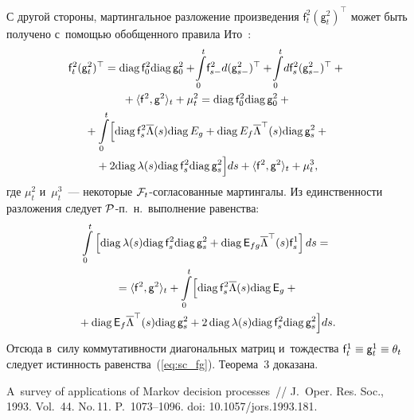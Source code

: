\begin{multicols}{2}
{   С другой стороны, мартингальное разложение произведения $\mathsf{f}_t^2 
(\mathsf{g}_t^2)^{\top} $ может быть получено с~по\-мощью обобщенного правила Ито~\cite{LSh_86}:
    \begin{multline*}
   \mathsf{f}_t^2 (\mathsf{g}_t^2)^{\top} =
   \mathrm{diag}\, \mathsf{f}_0^2  \mathrm{diag}\, \mathsf{g}_0^2 + \!\int\limits_0^t\! \mathsf{f}_{s-}^2d(\mathsf{g}_{s-}^2)^{\top} 
   +\!\int\limits_0^t \! d \mathsf{f}_{s}^2(\mathsf{g}_{s-}^2)^{\top} +{}\\
   {}+ \langle 
\mathsf{f}^2, \mathsf{g}^2\rangle_t + \mu_t^2 =
        \mathrm{diag}\, \mathsf{f}_0^2  \mathrm{diag}\, \mathsf{g}_0^2 + {}\\
        {} + \int\limits_0^t
    \Bigl[ \mathrm{diag}\, \mathsf{f}_{s}^2 \overline{\Lambda}(s) \mathrm{diag}\, E_g +
    \mathrm{diag}\, E_f \overline{\Lambda}^{\top}(s) \mathrm{diag}\, \mathsf{g}_{s}^2 +{}\\
    {}+
    2 \mathrm{diag}\, \lambda(s) \mathrm{diag}\, \mathsf{f}^2_s \mathrm{diag}\, \mathsf{g}^2_s
    \Bigl]ds +   \langle \mathsf{f}^2, \mathsf{g}^2\rangle_t + \mu_t^3,
   \end{multline*}
   где $\mu_t^2$ и~$\mu_t^3$~--- некоторые ${\mathcal F}_t$-согласованные мартингалы. Из 
единственности разложения следует ${\mathcal P}$-п.~н.\ выполнение равенства:
       \begin{multline*}
   \int\limits_0^t
   \left[
   \mathrm{diag}\, \lambda(s) \mathrm{diag}\, \mathsf{f}^2_s \mathrm{diag}\, \mathsf{g}^2_s + \mathrm{diag}\,{\mathsf E}_{fg} 
\overline{\Lambda}^{\top}(s) \mathsf{f}^1_s
   \right]ds = {}\\
   {}=  \langle \mathsf{f}^2, \mathsf{g}^2\rangle_t +
   \int\limits_0^t
    \Bigl[ \mathrm{diag}\,\mathsf{f}_{s}^2 \overline{\Lambda}(s) \mathrm{diag}\,{\mathsf E}_g +{}\\
    {}+
    \mathrm{diag}\,{\mathsf E}_f \overline{\Lambda}^{\top}(s)\mathrm{diag}\, \mathsf{g}_{s}^2 +
    2\,\mathrm{diag}\, \lambda(s) \mathrm{diag}\,\mathsf{f}^2_s \mathrm{diag}\, \mathsf{g}^2_s
    \Bigl]ds.
   \end{multline*}
   Отсюда в~силу коммутативности диагональных матриц и~тождества 
$\mathsf{f}_{t}^1 \hm\equiv \mathsf{g}_{t}^1\hm\equiv \theta_t$ следует истинность 
равенства~(\ref{eq:sc_fg}).
    Теорема~3 доказана.


}

{\small\frenchspacing
 {\baselineskip=11.5pt
 \begin{thebibliography}{99}
A~survey of applications of Markov decision processes~//
J.~Oper. Res. Soc., 1993. Vol.~44. No.\,11. P.~1073--1096. doi: 10.1057/jors.1993.181.


\end{thebibliography}}}
\end{multicols}
